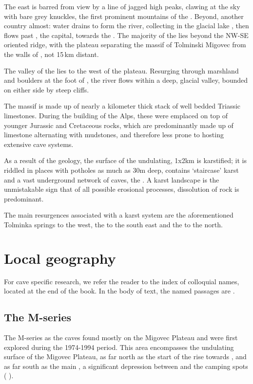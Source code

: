 The east is barred from view by a line of jagged high peaks, clawing at the sky with bare grey knuckles, the first prominent mountains of the . Beyond, another country almost: water drains to form the \passage{} river, collecting in the glacial lake , then flows past , the capital, towards the . The majority of the  lies beyond the NW-SE oriented ridge, with the  plateau separating the massif of Tolminski Migovec from the walls of , not 15\,km distant.

 The valley of the  lies to the west of the  plateau. Resurging through marshland and boulders at the foot of , the river flows within a deep, glacial valley, bounded on either side by steep cliffs. 

The  massif is made up of nearly a kilometer thick stack of well bedded Triassic limestones. During the building of the Alps, these were emplaced on top of younger Jurassic and Cretaceous rocks, which are predominantly made up of limestone alternating with mudstones, and therefore less prone to hosting extensive cave systems.

As a result of the geology, the surface of the undulating, 1x2km  is karstified; it is riddled in places with potholes as much as 30m deep, contains `staircase' karst and a vast underground network of caves, the . A karst landscape is the unmistakable sign that of all possible erosional processes, dissolution of rock is predominant.

The main resurgences associated with a karst system  are the aforementioned Tolminka springs to the west, the  to the south east and the  to the north.

\section{Local geography}
 For cave specific research, we refer the reader to the index of colloquial names, located at the end of the book. In the body of text, the named passages are .

\subsection{The M-series} 
The M-series as the caves found mostly on the Migovec Plateau and were first explored during the 1974-1994 period. This area encompasses the undulating surface of the Migovec Plateau, as far north as the start of the rise towards \protect{}, and as far south as the main \protect{}, a significant depression between \protect{} and the camping spots ( ).


